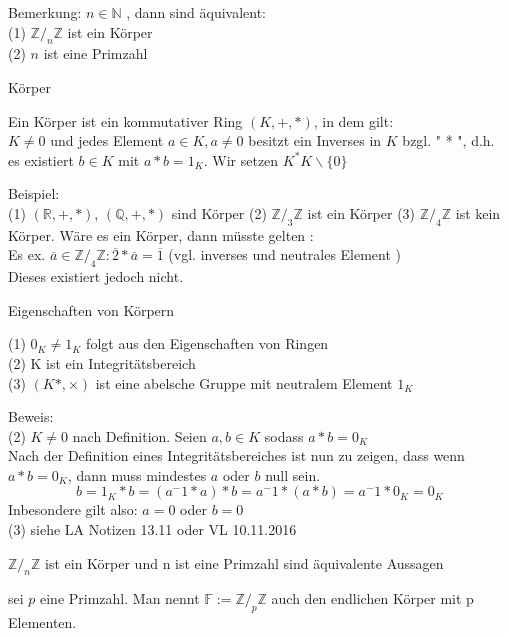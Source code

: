 \documentclass[smallheadings,12pt,a4paper]{scrartcl}
\begin{document}
\item Bemerkung: $n \in \mathbb{N} $ , dann sind äquivalent:\\
(1) $ \mathbb{Z}/_n \mathbb{Z} $ ist ein Körper\\
(2) $ n $ ist eine Primzahl 

\begin{center}
\item[ Körper ]
\end{center}
\item Ein Körper ist ein kommutativer Ring $(K,+,*)$, in dem gilt: \\
$ K \neq 0 $ und jedes Element $ a \in K, a \neq 0 $ besitzt ein Inverses in $K$ bzgl. " * ", d.h. \\
es existiert $b \in K $ mit $a*b = 1_K $. Wir setzen $K^* K \backslash \{0\}$
\item Beispiel: \\
(1) $(\mathbb{R},+,*)$, $(\mathbb{Q},+,*) $ sind Körper 
(2) $\mathbb{Z}/_3 \mathbb{Z} $ ist ein Körper 
(3) $\mathbb{Z}/_4 \mathbb{Z} $ ist kein Körper. Wäre es ein Körper, dann müsste gelten : \\
Es ex. $ \overline{a} \in \mathbb{Z}/_4 \mathbb{Z} : \overline{2} * \overline{a} = \overline{1} $ (vgl. inverses und neutrales Element )\\
Dieses existiert jedoch nicht. \\

\begin{center}
\item[ Eigenschaften von Körpern ]
\end{center}
(1) $ 0_K \neq 1_K $ folgt aus den Eigenschaften von Ringen \\
(2) K ist ein Integritätsbereich \\
(3) $(K*,\times ) $ ist eine abelsche Gruppe mit neutralem Element $1_K$ \\
\item Beweis: \\
(2) $ K \neq 0 $ nach Definition. Seien $a,b \in K $ sodass $a*b = 0_K$ \\
Nach der Definition eines Integritätsbereiches ist nun zu zeigen, dass wenn $a*b = 0_K$, dann muss mindestes $a$ oder $b$ null sein.
$$ b = 1_K * b = (a^-1 * a)*b = a^-1 * (a*b) = a^-1 * 0_K = 0_K $$ 
Inbesondere gilt also: $ a=0 $ oder $ b = 0 $ \\
(3) siehe LA Notizen 13.11 oder VL 10.11.2016\\

\item $\mathbb{Z}/_n \mathbb{Z} $ ist ein Körper und n ist eine Primzahl sind äquivalente Aussagen
\item sei $p$ eine Primzahl. Man nennt $ \mathbb{F} := \mathbb{Z} /_p \mathbb{Z} $ auch den endlichen Körper mit p Elementen.
\end{document}
